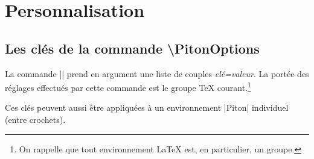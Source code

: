 \documentclass[dvipsnames,svgnames]{article}
\begin{document}
\section{Personnalisation}


\subsection{Les clés de la commande \textbackslash PitonOptions}



La commande |\PitonOptions| prend en argument une liste de couples \textsl{clé=valeur}. La
portée des réglages effectués par cette commande est le groupe TeX courant.\footnote{On
  rappelle que tout environnement LaTeX est, en particulier, un groupe.}

Ces clés peuvent aussi être appliquées à un environnement |{Piton}| individuel (entre
crochets).
\end{document}
